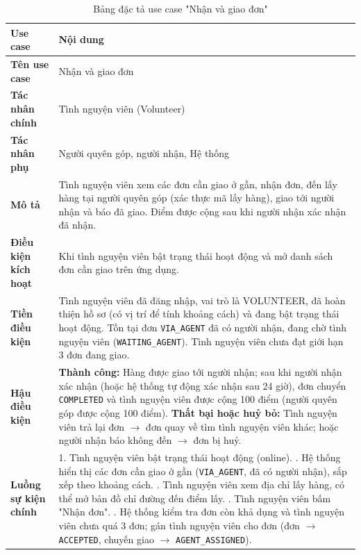 \documentclass[../main.tex]{subfiles}%
\begin{document}
\begingroup
\renewcommand{\arraystretch}{1.45}
\begin{longtable}{|p{3.5cm}|p{11.5cm}|}
\caption{Bảng đặc tả use case "Nhận và giao đơn"}
\label{tab:usecase_nhan_va_giao_don}\\
\hline
\textbf{Use case} & \textbf{Nội dung} \\ \hline
\textbf{Tên use case} & Nhận và giao đơn \\ \hline
\textbf{Tác nhân chính} & Tình nguyện viên (Volunteer) \\ \hline
\textbf{Tác nhân phụ} & Người quyên góp, người nhận, Hệ thống \\ \hline
\textbf{Mô tả} & Tình nguyện viên xem các đơn cần giao ở gần, nhận đơn, đến lấy hàng tại người quyên góp (xác thực mã lấy hàng), giao tới người nhận và báo đã giao. Điểm được cộng sau khi người nhận xác nhận đã nhận. \\ \hline
\textbf{Điều kiện kích hoạt} & Khi tình nguyện viên bật trạng thái hoạt động và mở danh sách đơn cần giao trên ứng dụng. \\ \hline
\textbf{Tiền điều kiện} & Tình nguyện viên đã đăng nhập, vai trò là VOLUNTEER, đã hoàn thiện hồ sơ (có vị trí để tính khoảng cách) và đang bật trạng thái hoạt động. Tồn tại đơn \texttt{VIA\_AGENT} đã có người nhận, đang chờ tình nguyện viên (\texttt{WAITING\_AGENT}). Tình nguyện viên chưa đạt giới hạn 3 đơn đang giao. \\ \hline
\textbf{Hậu điều kiện} &
\textbf{Thành công:} Hàng được giao tới người nhận; sau khi người nhận xác nhận (hoặc hệ thống tự động xác nhận sau 24 giờ), đơn chuyển \texttt{COMPLETED} và tình nguyện viên được cộng 100 điểm (người quyên góp được cộng 100 điểm). \newline
\textbf{Thất bại hoặc huỷ bỏ:} Tình nguyện viên trả lại đơn $\to$ đơn quay về tìm tình nguyện viên khác; hoặc người nhận báo không đến $\to$ đơn bị huỷ. \\ \hline
\textbf{Luồng sự kiện chính} &
1. Tình nguyện viên bật trạng thái hoạt động (online). \newline
2. Hệ thống hiển thị các đơn cần giao ở gần (\texttt{VIA\_AGENT}, đã có người nhận), sắp xếp theo khoảng cách. \newline
3. Tình nguyện viên xem địa chỉ lấy hàng, có thể mở bản đồ chỉ đường đến điểm lấy. \newline
4. Tình nguyện viên bấm "Nhận đơn". \newline
5. Hệ thống kiểm tra đơn còn khả dụng và tình nguyện viên chưa quá 3 đơn; gán tình nguyện viên cho đơn (đơn $\to$ \texttt{ACCEPTED}, chuyến giao $\to$ \texttt{AGENT\_ASSIGNED}). \newline

\end{longtable}
\end{document}
